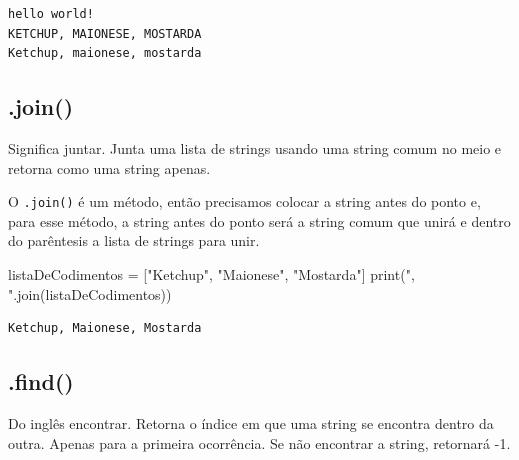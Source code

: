 \documentclass[
  letterpaper,
  DIV=11,
  numbers=noendperiod]{scrreprt}
\newenvironment{Shaded}{\begin{snugshade}}{\end{snugshade}}
\newcommand{\BuiltInTok}[1]{\textcolor[rgb]{0.00,0.23,0.31}{#1}}
\newcommand{\NormalTok}[1]{\textcolor[rgb]{0.00,0.23,0.31}{#1}}
\newcommand{\OperatorTok}[1]{\textcolor[rgb]{0.37,0.37,0.37}{#1}}
\newcommand{\StringTok}[1]{\textcolor[rgb]{0.13,0.47,0.30}{#1}}
\begin{document}
\begin{tcolorbox}[enhanced jigsaw, breakable, leftrule=.75mm, left=2mm, opacityback=0, bottomrule=.15mm, toprule=.15mm, rightrule=.15mm, arc=.35mm, colback=white]

\begin{verbatim}
hello world!
KETCHUP, MAIONESE, MOSTARDA
Ketchup, maionese, mostarda
\end{verbatim}

\end{tcolorbox}

\hypertarget{join}{%
\subsection{.join()}\label{join}}

Significa juntar. Junta uma lista de strings usando uma string comum no
meio e retorna como uma string apenas.

O \texttt{.join()} é um método, então precisamos colocar a string antes
do ponto e, para esse método, a string antes do ponto será a string
comum que unirá e dentro do parêntesis a lista de strings para unir.

\begin{Shaded}
\begin{Highlighting}[]
\NormalTok{listaDeCodimentos }\OperatorTok{=}\NormalTok{ [}\StringTok{"Ketchup"}\NormalTok{, }\StringTok{"Maionese"}\NormalTok{, }\StringTok{"Mostarda"}\NormalTok{]}
\BuiltInTok{print}\NormalTok{(}\StringTok{", "}\NormalTok{.join(listaDeCodimentos))}
\end{Highlighting}
\end{Shaded}

\begin{tcolorbox}[enhanced jigsaw, breakable, leftrule=.75mm, left=2mm, opacityback=0, bottomrule=.15mm, toprule=.15mm, rightrule=.15mm, arc=.35mm, colback=white]

\begin{verbatim}
Ketchup, Maionese, Mostarda
\end{verbatim}

\end{tcolorbox}

\hypertarget{find}{%
\subsection{.find()}\label{find}}

Do inglês encontrar. Retorna o índice em que uma string se encontra
dentro da outra. Apenas para a primeira ocorrência. Se não encontrar a
string, retornará -1.
\end{document}
